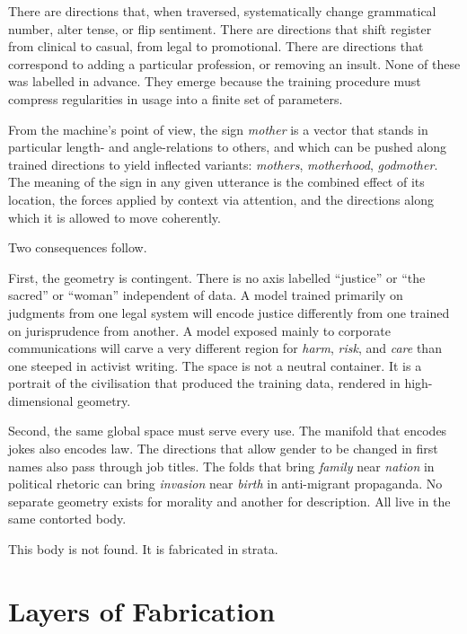 \documentclass[12pt,a4paper]{article}
\begin{document}
There are directions that, when traversed, systematically change grammatical number, alter tense, or flip sentiment. There are directions that shift register from clinical to casual, from legal to promotional. There are directions that correspond to adding a particular profession, or removing an insult. None of these was labelled in advance. They emerge because the training procedure must compress regularities in usage into a finite set of parameters.

From the machine's point of view, the sign \emph{mother} is a vector that stands in particular length- and angle-relations to others, and which can be pushed along trained directions to yield inflected variants: \emph{mothers}, \emph{motherhood}, \emph{godmother}. The meaning of the sign in any given utterance is the combined effect of its location, the forces applied by context via attention, and the directions along which it is allowed to move coherently.

Two consequences follow.

First, the geometry is contingent. There is no axis labelled ``justice'' or ``the sacred'' or ``woman'' independent of data. A model trained primarily on judgments from one legal system will encode justice differently from one trained on jurisprudence from another. A model exposed mainly to corporate communications will carve a very different region for \emph{harm}, \emph{risk}, and \emph{care} than one steeped in activist writing. The space is not a neutral container. It is a portrait of the civilisation that produced the training data, rendered in high-dimensional geometry.

Second, the same global space must serve every use. The manifold that encodes jokes also encodes law. The directions that allow gender to be changed in first names also pass through job titles. The folds that bring \emph{family} near \emph{nation} in political rhetoric can bring \emph{invasion} near \emph{birth} in anti-migrant propaganda. No separate geometry exists for morality and another for description. All live in the same contorted body.

This body is not found. It is fabricated in strata.

\section{Layers of Fabrication}
\end{document}
